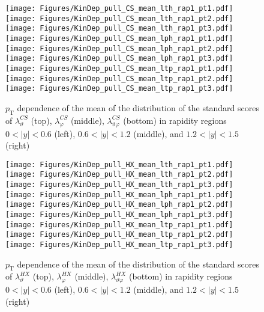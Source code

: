 \documentclass[12pt]{article}
\newcommand{\pT}{p_\mathrm{T}}
\newcommand{\absy}{\left |  y \right |}
\newcommand{\lamthCS}{\lambda^{\scriptscriptstyle CS}_\vartheta}
\newcommand{\lamphCS}{\lambda^{\scriptscriptstyle CS}_\varphi}
\newcommand{\lamthphCS}{\lambda^{\scriptscriptstyle CS}_{\vartheta \varphi}}
\newcommand{\lamthHX}{\lambda^{\scriptscriptstyle HX}_\vartheta}
\newcommand{\lamphHX}{\lambda^{\scriptscriptstyle HX}_\varphi}
\newcommand{\lamthphHX}{\lambda^{\scriptscriptstyle HX}_{\vartheta \varphi}}
\begin{document}


\begin{figure}[htbp]
\centering
\texttt{[image: Figures/KinDep\_pull\_CS\_mean\_lth\_rap1\_pt1.pdf]}
\texttt{[image: Figures/KinDep\_pull\_CS\_mean\_lth\_rap1\_pt2.pdf]}
\texttt{[image: Figures/KinDep\_pull\_CS\_mean\_lth\_rap1\_pt3.pdf]}
\texttt{[image: Figures/KinDep\_pull\_CS\_mean\_lph\_rap1\_pt1.pdf]}
\texttt{[image: Figures/KinDep\_pull\_CS\_mean\_lph\_rap1\_pt2.pdf]}
\texttt{[image: Figures/KinDep\_pull\_CS\_mean\_lph\_rap1\_pt3.pdf]}
\texttt{[image: Figures/KinDep\_pull\_CS\_mean\_ltp\_rap1\_pt1.pdf]}
\texttt{[image: Figures/KinDep\_pull\_CS\_mean\_ltp\_rap1\_pt2.pdf]}
\texttt{[image: Figures/KinDep\_pull\_CS\_mean\_ltp\_rap1\_pt3.pdf]}
\caption{$\pT$ dependence of the mean of the distribution of the standard scores
of $\lamthCS$ (top), $\lamphCS$ (middle), $\lamthphCS$ (bottom) in rapidity
regions $0<\absy<0.6$ (left), $0.6<\absy<1.2$ (middle), and $1.2<\absy<1.5$ (right)}
\end{figure}
\clearpage

\begin{figure}[htbp]
\centering
\texttt{[image: Figures/KinDep\_pull\_HX\_mean\_lth\_rap1\_pt1.pdf]}
\texttt{[image: Figures/KinDep\_pull\_HX\_mean\_lth\_rap1\_pt2.pdf]}
\texttt{[image: Figures/KinDep\_pull\_HX\_mean\_lth\_rap1\_pt3.pdf]}
\texttt{[image: Figures/KinDep\_pull\_HX\_mean\_lph\_rap1\_pt1.pdf]}
\texttt{[image: Figures/KinDep\_pull\_HX\_mean\_lph\_rap1\_pt2.pdf]}
\texttt{[image: Figures/KinDep\_pull\_HX\_mean\_lph\_rap1\_pt3.pdf]}
\texttt{[image: Figures/KinDep\_pull\_HX\_mean\_ltp\_rap1\_pt1.pdf]}
\texttt{[image: Figures/KinDep\_pull\_HX\_mean\_ltp\_rap1\_pt2.pdf]}
\texttt{[image: Figures/KinDep\_pull\_HX\_mean\_ltp\_rap1\_pt3.pdf]}
\caption{$\pT$ dependence of the mean of the distribution of the standard scores
of $\lamthHX$ (top), $\lamphHX$ (middle), $\lamthphHX$ (bottom) in rapidity
regions $0<\absy<0.6$ (left), $0.6<\absy<1.2$ (middle), and $1.2<\absy<1.5$ (right)}
\end{figure}
\clearpage
\end{document}
